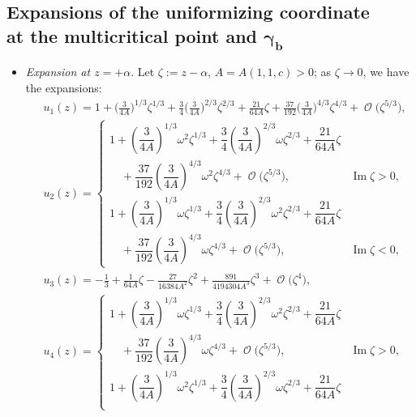 \documentclass[pdftex]{sigma}
\DeclareMathOperator{\OO}{\mathcal{O}}
\numberwithin{equation}{section}
\begin{document}
\subsection[Expansions of the uniformizing coordinate at the multicritical point and $\gamma_b$]{Expansions of the uniformizing coordinate\\ at the multicritical point and $\boldsymbol{\gamma_b}$}
\begin{itemize}\itemsep=0pt
 \item \textit{Expansion at $z= +\alpha$}. Let $\zeta:=z-\alpha$, $A = A(1,1,c)>0$; as $\zeta\to 0$, we have the expansions:
 \begin{align*}
 &u_1(z) = 1+ \biggl(\frac{3}{4A}\biggr)^{1/3}\!\zeta^{1/3} + \frac{3}{4}\biggl(\frac{3}{4A}\biggr)^{2/3}\!\zeta^{2/3} + \frac{21}{64A}\!\zeta + \frac{37}{192}\biggl(\frac{3}{4A}\biggr)^{4/3}\zeta^{4/3} + \OO\bigl(\zeta^{5/3}\bigr),\\
 &u_2(z) =
 \begin{cases}
 1+ \left(\dfrac{3}{4A}\right)^{1/3}\omega^2\zeta^{1/3} + \dfrac{3}{4}\left(\dfrac{3}{4A}\right)^{2/3}\omega\zeta^{2/3} + \dfrac{21}{64A}\zeta&\\
 \quad{}+ \dfrac{37}{192}\left(\dfrac{3}{4A}\right)^{4/3}\omega^2\zeta^{4/3} + \OO\bigl(\zeta^{5/3}\bigr),
 & \operatorname{Im}\zeta >0,\\[1mm]
 1+ \left(\dfrac{3}{4A}\right)^{1/3}\omega\zeta^{1/3} + \dfrac{3}{4}\left(\dfrac{3}{4A}\right)^{2/3}\omega^2\zeta^{2/3} + \dfrac{21}{64A}\zeta&\\
 \quad{}+ \dfrac{37}{192}\left(\dfrac{3}{4A}\right)^{4/3}\omega\zeta^{4/3} + \OO\bigl(\zeta^{5/3}\bigr), & \operatorname{Im}\zeta <0,
 \end{cases}\\
 &u_3(z) =-\frac{1}{3} + \frac{1}{64A}\zeta - \frac{27}{16384A^2}\zeta^2 + \frac{891}{4194304A^3}\zeta^3 + \OO\bigl(\zeta^4\bigr),\\
 &u_4(z) =
 \begin{cases}
 1+ \left(\dfrac{3}{4A}\right)^{1/3}\omega\zeta^{1/3} + \dfrac{3}{4}\left(\dfrac{3}{4A}\right)^{2/3}\omega^2\zeta^{2/3}+ \dfrac{21}{64A}\zeta&\\
 \quad{}+ \dfrac{37}{192}\left(\dfrac{3}{4A}\right)^{4/3}\omega\zeta^{4/3} + \OO\bigl(\zeta^{5/3}\bigr), & \operatorname{Im}\zeta >0,\\[0.8mm]
 1+ \left(\dfrac{3}{4A}\right)^{1/3}\omega^2\zeta^{1/3} + \dfrac{3}{4}\left(\dfrac{3}{4A}\right)^{2/3}\omega\zeta^{2/3}+ \dfrac{21}{64A}\zeta&\\

\end{cases}
\end{align*}
\end{itemize}
\end{document}
